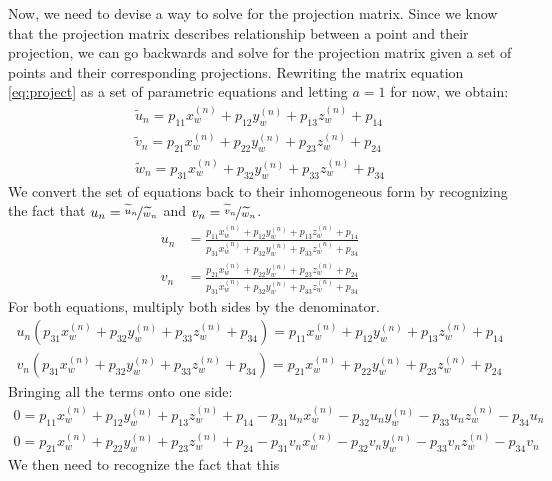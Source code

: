 Now, we need to devise a way to solve for the projection matrix. Since we know that the projection matrix describes relationship between a point and their projection, we can go backwards and solve for the projection matrix given a set of points and their corresponding projections. Rewriting the matrix equation \ref{eq:project} as a set of parametric equations and letting $a=1$ for now, we obtain:
\begin{align*}
    \widetilde{u}_n = p_{11}x_w^{(n)} + p_{12}y_w^{(n)} + p_{13}z_w^{(n)} + p_{14} \\
    \widetilde{v}_n = p_{21}x_w^{(n)} + p_{22}y_w^{(n)} + p_{23}z_w^{(n)} + p_{24} \\
    \widetilde{w}_n = p_{31}x_w^{(n)} + p_{32}y_w^{(n)} + p_{33}z_w^{(n)} + p_{34}
\end{align*}
We convert the set of equations back to their inhomogeneous form by recognizing the fact that $u_n = \nicefrac{\widetilde{u}_n}{\widetilde{w}_n}$ and $v_n = \nicefrac{\widetilde{v}_n}{\widetilde{w}_n}$. 
\begin{align*}
    u_n & = \frac{p_{11}x_w^{(n)} + p_{12}y_w^{(n)} + p_{13}z_w^{(n)} + p_{14}}{p_{31}x_w^{(n)} + p_{32}y_w^{(n)} + p_{33}z_w^{(n)} + p_{34}} \\
    v_n & = \frac{p_{21}x_w^{(n)} + p_{22}y_w^{(n)} + p_{23}z_w^{(n)} + p_{24}}{p_{31}x_w^{(n)} + p_{32}y_w^{(n)} + p_{33}z_w^{(n)} + p_{34}}
\end{align*}
For both equations, multiply both sides by the denominator.
\begin{align*}
    u_n(p_{31}x_w^{(n)} + p_{32}y_w^{(n)} + p_{33}z_w^{(n)} + p_{34}) = p_{11}x_w^{(n)} + p_{12}y_w^{(n)} + p_{13}z_w^{(n)} + p_{14} \\
    v_n(p_{31}x_w^{(n)} + p_{32}y_w^{ (n)} + p_{33}z_w^{(n)} + p_{34}) = p_{21}x_w^{(n)} + p_{22}y_w^{(n)} + p_{23}z_w^{(n)} + p_{24}
\end{align*}
Bringing all the terms onto one side:
\begin{subequations}
    \begin{align}
        0 = p_{11}x_w^{(n)} + p_{12}y_w^{(n)} + p_{13}z_w^{(n)} + p_{14} - p_{31}u_nx_w^{(n)} - p_{32}u_ny_w^{(n)} - p_{33}u_nz_w^{(n)} - p_{34}u_n \\
        0 = p_{21}x_w^{(n)} + p_{22}y_w^{(n)} + p_{23}z_w^{(n)} + p_{24} - p_{31}v_nx_w^{(n)} - p_{32}v_ny_w^{(n)} - p_{33}v_nz_w^{(n)} - p_{34}v_n
    \end{align}
\end{subequations}
We then need to recognize the fact that this 

